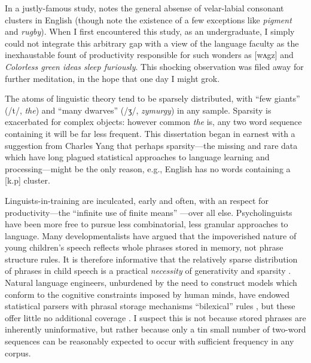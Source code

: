 In a justly-famous study, \citet{Pierrehumbert1994} notes the general absense of velar-labial consonant clusters in English (though note the existence of a few exceptions like \emph{pigment} and \emph{rugby}). When I first encountered this study, as an undergraduate, I simply could not integrate this arbitrary gap with a view of the language faculty as the inexhaustable fount of productivity responsible for such wonders as [wʌgz] and \emph{Colorless green ideas sleep furiously}. This shocking observation was filed away for further meditation, in the hope that one day I might grok.

The atoms of linguistic theory tend to be sparsely distributed, with ``few giants'' (/t/, \emph{the}) and ``many dwarves'' (/ʒ/, \emph{zymurgy}) in any sample. Sparsity is exacerbated for complex objects: however common \emph{the} is, any two word sequence containing it will be far less frequent. This dissertation began in earnest with a suggestion from Charles Yang that perhaps sparsity---the missing and rare data which have long plagued statistical approaches to language learning and processing---might be the only reason, e.g., English has no words containing a [k.p] cluster. 

Linguists-in-training are inculcated, early and often, with an respect for productivity---the ``infinite use of finite means'' \citep[8]{ASPECTS}---over all else. Psycholinguists have been more free to pursue less combinatorial, less granular approaches to language. Many developmentalists have argued that the impoverished nature of young children's speech reflects whole phrases stored in memory, not phrase structure rules. It is therefore informative that the relatively sparse distribution of phrases in child speech is a practical \emph{necessity} of generativity and sparsity \citep{Yang2011b}. Natural language engineers, unburdened by the need to construct models which conform to the cognitive constraints imposed by human minds, have endowed statistical parsers with phrasal storage mechanisms ``bilexical'' rules \citep[e.g.,][]{Collins1999}, but these offer little no additional coverage \citep{Bikel2004}. I suspect this is not because stored phrases are inherently uninformative, but rather because only a tin small number of two-word sequences can be reasonably expected to occur with sufficient frequency in any corpus. 

